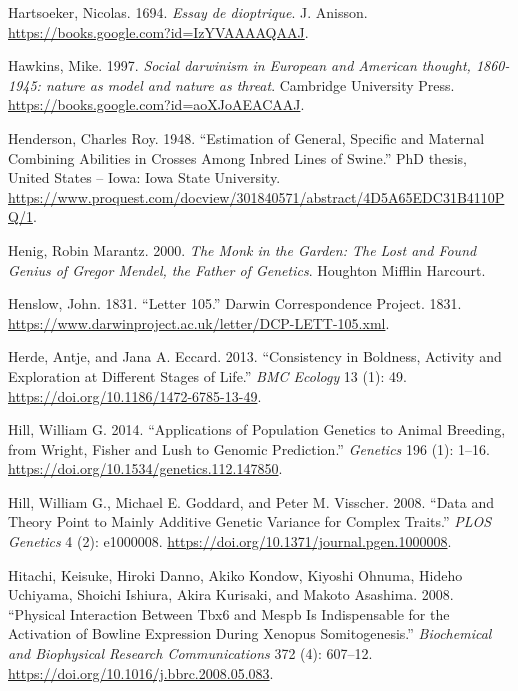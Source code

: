 \documentclass[
]{book}
\newlength{\cslhangindent}
\newlength{\cslentryspacingunit} %
\newenvironment{CSLReferences}[2] %
 {%
  \setlength{\parindent}{0pt}
  \ifodd #1
  \let\oldpar\par
  \def\par{\hangindent=\cslhangindent\oldpar}
  \fi
  \setlength{\parskip}{#2\cslentryspacingunit}
 }%
 {}
\begin{document}
\begin{CSLReferences}{1}{0}
\leavevmode{}%
Hartsoeker, Nicolas. 1694. \emph{Essay de dioptrique}. {J. Anisson}. \url{https://books.google.com?id=IzYVAAAAQAAJ}.

\leavevmode{}%
Hawkins, Mike. 1997. \emph{Social darwinism in European and American thought, 1860-1945: nature as model and nature as threat}. {Cambridge University Press}. \url{https://books.google.com?id=aoXJoAEACAAJ}.

\leavevmode{}%
Henderson, Charles Roy. 1948. {``Estimation of General, Specific and Maternal Combining Abilities in Crosses Among Inbred Lines of Swine.''} PhD thesis, {United States -- Iowa}: {Iowa State University}. \url{https://www.proquest.com/docview/301840571/abstract/4D5A65EDC31B4110PQ/1}.

\leavevmode{}%
Henig, Robin Marantz. 2000. \emph{The {Monk} in the {Garden}: {The Lost} and {Found Genius} of {Gregor Mendel}, the {Father} of {Genetics}}. {Houghton Mifflin Harcourt}.

\leavevmode{}%
Henslow, John. 1831. {``Letter 105.''} {Darwin Correspondence Project}. 1831. \url{https://www.darwinproject.ac.uk/letter/DCP-LETT-105.xml}.

\leavevmode{}%
Herde, Antje, and Jana A. Eccard. 2013. {``Consistency in Boldness, Activity and Exploration at Different Stages of Life.''} \emph{BMC Ecology} 13 (1): 49. \url{https://doi.org/10.1186/1472-6785-13-49}.

\leavevmode{}%
Hill, William G. 2014. {``Applications of {Population Genetics} to {Animal Breeding}, from {Wright}, {Fisher} and {Lush} to {Genomic Prediction}.''} \emph{Genetics} 196 (1): 1--16. \url{https://doi.org/10.1534/genetics.112.147850}.

\leavevmode{}%
Hill, William G., Michael E. Goddard, and Peter M. Visscher. 2008. {``Data and {Theory Point} to {Mainly Additive Genetic Variance} for {Complex Traits}.''} \emph{PLOS Genetics} 4 (2): e1000008. \url{https://doi.org/10.1371/journal.pgen.1000008}.

\leavevmode{}%
Hitachi, Keisuke, Hiroki Danno, Akiko Kondow, Kiyoshi Ohnuma, Hideho Uchiyama, Shoichi Ishiura, Akira Kurisaki, and Makoto Asashima. 2008. {``Physical Interaction Between {Tbx6} and Mespb Is Indispensable for the Activation of Bowline Expression During {Xenopus} Somitogenesis.''} \emph{Biochemical and Biophysical Research Communications} 372 (4): 607--12. \url{https://doi.org/10.1016/j.bbrc.2008.05.083}.


\end{CSLReferences}
\end{document}
